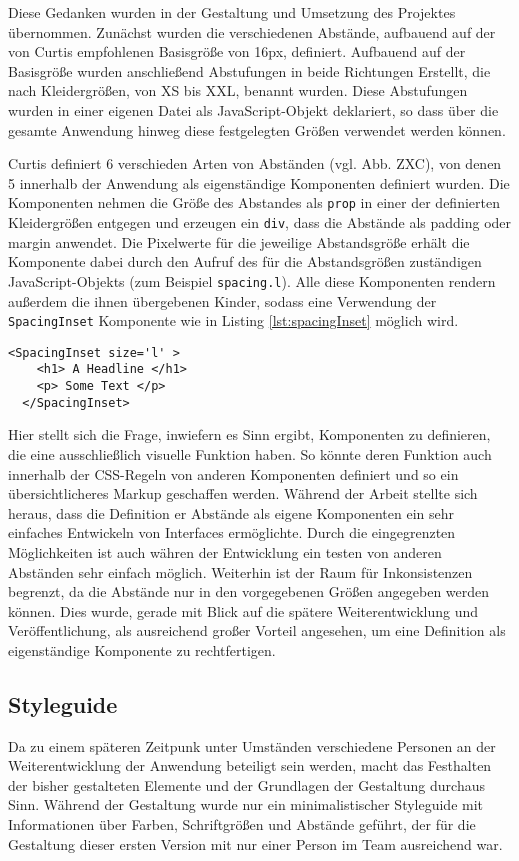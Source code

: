 Diese Gedanken wurden in der Gestaltung und Umsetzung des Projektes übernommen. Zunächst wurden die verschiedenen Abstände, aufbauend auf der von Curtis empfohlenen Basisgröße von 16px, definiert. Aufbauend auf der Basisgröße wurden anschließend Abstufungen in beide Richtungen
Erstellt, die nach Kleidergrößen, von XS bis XXL, benannt wurden.
Diese Abstufungen wurden in einer eigenen Datei als JavaScript-Objekt deklariert, so dass über die gesamte Anwendung hinweg diese festgelegten Größen verwendet werden können.

Curtis definiert 6 verschieden Arten von Abständen (vgl. Abb. ZXC), von denen 5 innerhalb der Anwendung als eigenständige Komponenten definiert wurden.
Die Komponenten nehmen die Größe des Abstandes als \verb|prop| in einer der definierten Kleidergrößen entgegen und erzeugen ein \verb|div|, dass die Abstände als padding oder margin anwendet.
Die Pixelwerte für die jeweilige Abstandsgröße erhält die Komponente dabei durch den Aufruf des für die Abstandsgrößen zuständigen JavaScript-Objekts (zum Beispiel \verb|spacing.l|). Alle diese Komponenten rendern außerdem die ihnen übergebenen Kinder, sodass eine Verwendung der \verb|SpacingInset| Komponente wie in Listing \ref{lst:spacingInset} möglich wird.

\begin{lstlisting}[caption=Beispielhafte Verwendung einer Komponente für Abstände, label=lst:spacingInset]
  <SpacingInset size='l' >
    <h1> A Headline </h1>
    <p> Some Text </p>
  </SpacingInset>
\end{lstlisting}

Hier stellt sich die Frage, inwiefern es Sinn ergibt, Komponenten zu definieren, die eine ausschließlich visuelle Funktion haben.
So könnte deren Funktion auch innerhalb der CSS-Regeln von anderen Komponenten definiert und so ein übersichtlicheres Markup geschaffen werden.
Während der Arbeit stellte sich heraus, dass die Definition er Abstände als eigene Komponenten ein sehr einfaches Entwickeln von Interfaces ermöglichte.  Durch die eingegrenzten Möglichkeiten ist auch währen der Entwicklung ein testen von anderen Abständen sehr einfach möglich.
Weiterhin ist der Raum für Inkonsistenzen begrenzt, da die Abstände nur in den vorgegebenen Größen angegeben werden können. Dies wurde, gerade mit Blick auf die spätere Weiterentwicklung und Veröffentlichung, als ausreichend großer Vorteil angesehen, um eine Definition als eigenständige Komponente zu rechtfertigen.

\subsection{Styleguide}
Da zu einem späteren Zeitpunk unter Umständen verschiedene Personen an der Weiterentwicklung der Anwendung beteiligt sein werden, macht das Festhalten der bisher gestalteten Elemente und der Grundlagen der Gestaltung durchaus Sinn.
Während der Gestaltung wurde nur ein minimalistischer Styleguide mit Informationen über Farben, Schriftgrößen und Abstände geführt, der für die Gestaltung dieser ersten Version mit nur einer Person im Team ausreichend war.

